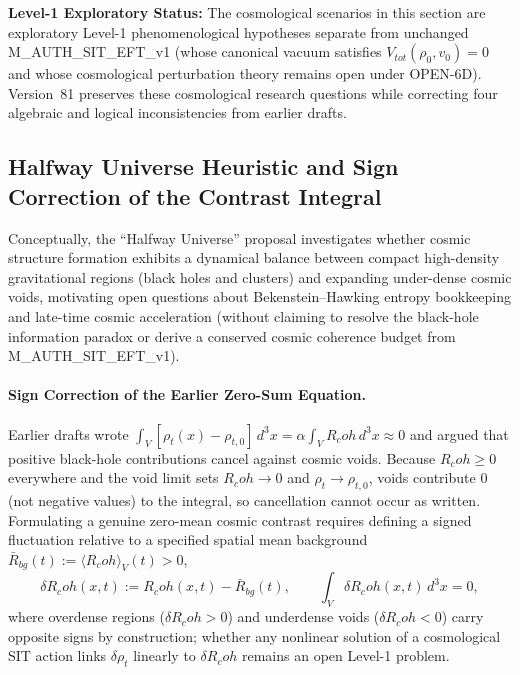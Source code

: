 \documentclass[american,11pt,letterpaper]{article}
\newcommand{\Rcoh}{R_{\mathrm{coh}}}
\def\mathbf#1{#1}%
\def\mathcal#1{#1}%
\def\mathrm#1{#1}%
\def\texttt#1{#1}%
\def\emph#1{#1}%
\def\Rcoh{R_coh}%
\begin{document}
\textbf{Level-1 Exploratory Status:} The cosmological scenarios in this section are \emph{exploratory Level-1 phenomenological hypotheses} separate from unchanged \texttt{M\_AUTH\_SIT\_EFT\_v1} (whose canonical vacuum satisfies $V_{\mathrm{tot}}(\rho_0, v_0) = 0$ and whose cosmological perturbation theory remains open under \texttt{OPEN-6D}). Version~81 preserves these cosmological research questions while correcting four algebraic and logical inconsistencies from earlier drafts.

\subsection{Halfway Universe Heuristic and Sign Correction of the Contrast Integral}

Conceptually, the ``Halfway Universe'' proposal investigates whether cosmic structure formation exhibits a dynamical balance between compact high-density gravitational regions (black holes and clusters) and expanding under-dense cosmic voids, motivating open questions about Bekenstein--Hawking entropy bookkeeping and late-time cosmic acceleration (without claiming to resolve the black-hole information paradox or derive a conserved cosmic coherence budget from \texttt{M\_AUTH\_SIT\_EFT\_v1}).

\paragraph{Sign Correction of the Earlier Zero-Sum Equation.}
Earlier drafts wrote $\int_{\mathcal{V}}[\rho_t(\mathbf{x}) - \rho_{t,0}]\,d^3x = \alpha\int_{\mathcal{V}}\Rcoh\,d^3x \approx 0$ and argued that positive black-hole contributions cancel against cosmic voids. Because $\Rcoh \ge 0$ everywhere and the void limit sets $\Rcoh \to 0$ and $\rho_t \to \rho_{t,0}$, voids contribute $0$ (not negative values) to the integral, so cancellation cannot occur as written. Formulating a genuine zero-mean cosmic contrast requires defining a \emph{signed} fluctuation relative to a specified spatial mean background $\bar{R}_{\mathrm{bg}}(t) := \langle\Rcoh\rangle_{\mathcal{V}}(t) > 0$,
\begin{equation}
\delta\Rcoh(\mathbf{x}, t) := \Rcoh(\mathbf{x}, t) - \bar{R}_{\mathrm{bg}}(t),
\qquad
\int_{\mathcal{V}} \delta\Rcoh(\mathbf{x}, t)\,d^3x = 0,
\label{eq:signed_cosmic_contrast}
\end{equation}
where overdense regions ($\delta\Rcoh > 0$) and underdense voids ($\delta\Rcoh < 0$) carry opposite signs by construction; whether any nonlinear solution of a cosmological SIT action links $\delta\rho_t$ linearly to $\delta\Rcoh$ remains an open Level-1 problem.
\end{document}
